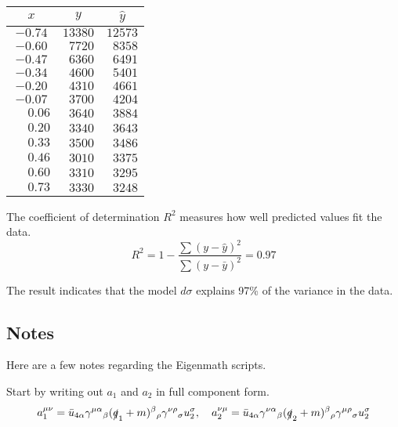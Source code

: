 \documentclass[12pt]{article}
\begin{document}
\begin{center}
\begin{tabular}{|c|c|c|}
\hline
$x$ & $y$ & $\hat{y}$\\
\hline
$-0.74$ & $13380$ & $12573$\\
$-0.60$ & $\phantom{0}7720$ & $\phantom{0}8358$\\
$-0.47$ & $\phantom{0}6360$ & $\phantom{0}6491$\\
$-0.34$ & $\phantom{0}4600$ & $\phantom{0}5401$\\
$-0.20$ & $\phantom{0}4310$ & $\phantom{0}4661$\\
$-0.07$ & $\phantom{0}3700$ & $\phantom{0}4204$\\
$\phantom{+}0.06$ & $\phantom{0}3640$ & $\phantom{0}3884$\\
$\phantom{+}0.20$ & $\phantom{0}3340$ & $\phantom{0}3643$\\
$\phantom{+}0.33$ & $\phantom{0}3500$ & $\phantom{0}3486$\\
$\phantom{+}0.46$ & $\phantom{0}3010$ & $\phantom{0}3375$\\
$\phantom{+}0.60$ & $\phantom{0}3310$ & $\phantom{0}3295$\\
$\phantom{+}0.73$ & $\phantom{0}3330$ & $\phantom{0}3248$\\
\hline
\end{tabular}
\end{center}

The coefficient of determination $R^2$ measures how well predicted values fit the data.
\begin{equation*}
R^2=1-\frac{\sum(y-\hat{y})^2}{\sum(y-\bar{y})^2}=0.97
\end{equation*}

The result indicates that the model $d\sigma$ explains 97\% of the variance in the data.

\fi

\subsection*{Notes}
Here are a few notes regarding the Eigenmath scripts.

\bigskip
Start by writing out $a_1$ and $a_2$ in full component form.
\begin{equation*}
a_1^{\mu\nu}
=\bar{u}_{4\alpha}\gamma^{\mu\alpha}{}_\beta(\slashed{q}_1+m)^\beta{}_\rho\gamma^{\nu\rho}{}_\sigma u_2^\sigma,
\quad
a_2^{\nu\mu}
=\bar{u}_{4\alpha}\gamma^{\nu\alpha}{}_\beta(\slashed{q}_2+m)^\beta{}_\rho\gamma^{\mu\rho}{}_\sigma u_2^\sigma
\end{equation*}
\end{document}
